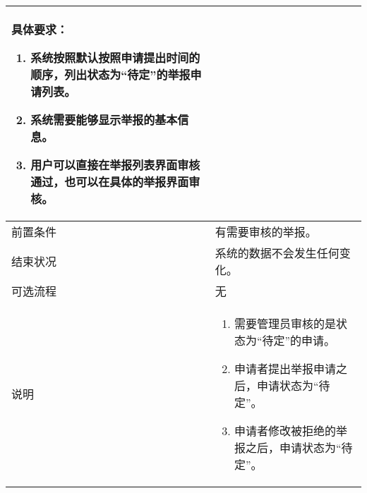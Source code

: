 \begin{table}[htbp]
\begin{tabular}{|l|l|l|l|}
{\begin{minipage}[t]{0.8\textwidth}
                具体要求：
                \begin{enumerate}
                    \item 系统按照默认按照申请提出时间的顺序，列出状态为“待定”的举报申请列表。
                    \item 系统需要能够显示举报的基本信息。
                    \item 用户可以直接在举报列表界面审核通过，也可以在具体的举报界面审核。
                \end{enumerate}
                \vspace{.5em}
            \end{minipage}}                                                                                                                                                                                  \\
        \hline
        前置条件                          & \multicolumn{3}{l|}{有需要审核的举报。}                                                                                                                                  \\
        \hline
        结束状况                          & \multicolumn{3}{l|}{系统的数据不会发生任何变化。   }                                                                                                                     \\
        \hline
        可选流程                          & \multicolumn{3}{l|}{无}                                                                                                                                                  \\
        \hline
        说明                              & \multicolumn{3}{l|}{
            \begin{minipage}[t]{0.8\textwidth}
                \begin{enumerate}
                    \item 需要管理员审核的是状态为“待定”的申请。
                    \item 申请者提出举报申请之后，申请状态为“待定”。
                    \item 申请者修改被拒绝的举报之后，申请状态为“待定”。
                \end{enumerate}
                \vspace{.5em}
            \end{minipage}
        }                                                                                                                                                                                                            \\
        \hline
    \end{tabular}
\end{table}

